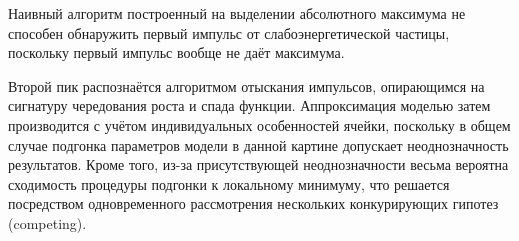 Наивный алгоритм построенный на выделении абсолютного максимума
не способен обнаружить первый импульс от слабоэнергетической частицы,
поскольку первый импульс вообще не даёт максимума. 

Второй пик распознаётся алгоритмом отыскания
импульсов, опирающимся на сигнатуру чередования роста и спада
функции. Аппроксимация моделью затем производится с учётом
индивидуальных особенностей ячейки, поскольку в общем случае
подгонка параметров модели в данной картине допускает неоднозначность
результатов. Кроме того, из-за присутствующей неоднозначности
весьма вероятна сходимость процедуры подгонки к локальному минимуму,
что решается посредством одновременного рассмотрения
нескольких конкурирующих гипотез (competing).
